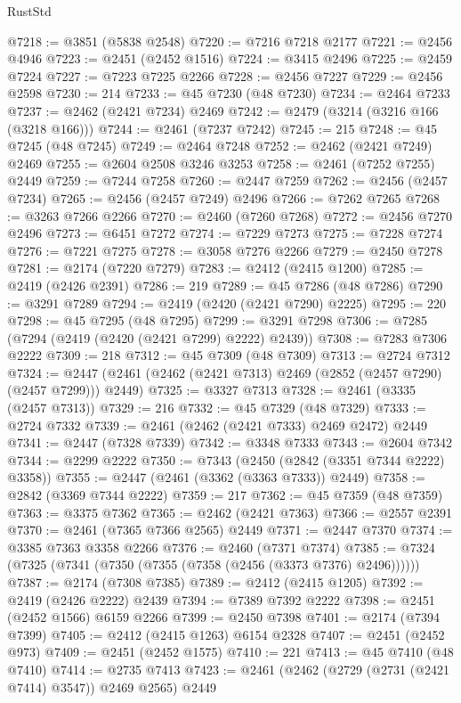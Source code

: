 \begin{lexlean}{RustStd}
\begin{coremodule}
@7218 := @3851 (@5838 @2548)
@7220 := @7216 @7218 @2177
@7221 := @2456 @4946
@7223 := @2451 (@2452 @1516)
@7224 := @3415 @2496
@7225 := @2459 @7224
@7227 := @7223 @7225 @2266
@7228 := @2456 @7227
@7229 := @2456 @2598
@7230 := 214
@7233 := @45 @7230 (@48 @7230)
@7234 := @2464 @7233
@7237 := @2462 (@2421 @7234) @2469
@7242 := @2479 (@3214 (@3216 @166 (@3218 @166)))
@7244 := @2461 (@7237 @7242)
@7245 := 215
@7248 := @45 @7245 (@48 @7245)
@7249 := @2464 @7248
@7252 := @2462 (@2421 @7249) @2469
@7255 := @2604 @2508 @3246 @3253
@7258 := @2461 (@7252 @7255) @2449
@7259 := @7244 @7258
@7260 := @2447 @7259
@7262 := @2456 (@2457 @7234)
@7265 := @2456 (@2457 @7249) @2496
@7266 := @7262 @7265
@7268 := @3263 @7266 @2266
@7270 := @2460 (@7260 @7268)
@7272 := @2456 @7270 @2496
@7273 := @6451 @7272
@7274 := @7229 @7273
@7275 := @7228 @7274
@7276 := @7221 @7275
@7278 := @3058 @7276 @2266
@7279 := @2450 @7278
@7281 := @2174 (@7220 @7279)
@7283 := @2412 (@2415 @1200)
@7285 := @2419 (@2426 @2391)
@7286 := 219
@7289 := @45 @7286 (@48 @7286)
@7290 := @3291 @7289
@7294 := @2419 (@2420 (@2421 @7290) @2225)
@7295 := 220
@7298 := @45 @7295 (@48 @7295)
@7299 := @3291 @7298
@7306 := @7285 (@7294 (@2419 (@2420 (@2421 @7299) @2222) @2439))
@7308 := @7283 @7306 @2222
@7309 := 218
@7312 := @45 @7309 (@48 @7309)
@7313 := @2724 @7312
@7324 := @2447 (@2461 (@2462 (@2421 @7313) @2469 (@2852 (@2457 @7290) (@2457 @7299))) @2449)
@7325 := @3327 @7313
@7328 := @2461 (@3335 (@2457 @7313))
@7329 := 216
@7332 := @45 @7329 (@48 @7329)
@7333 := @2724 @7332
@7339 := @2461 (@2462 (@2421 @7333) @2469 @2472) @2449
@7341 := @2447 (@7328 @7339)
@7342 := @3348 @7333
@7343 := @2604 @7342
@7344 := @2299 @2222
@7350 := @7343 (@2450 (@2842 (@3351 @7344 @2222) @3358))
@7355 := @2447 (@2461 (@3362 (@3363 @7333)) @2449)
@7358 := @2842 (@3369 @7344 @2222)
@7359 := 217
@7362 := @45 @7359 (@48 @7359)
@7363 := @3375 @7362
@7365 := @2462 (@2421 @7363)
@7366 := @2557 @2391
@7370 := @2461 (@7365 @7366 @2565) @2449
@7371 := @2447 @7370
@7374 := @3385 @7363 @3358 @2266
@7376 := @2460 (@7371 @7374)
@7385 := @7324 (@7325 (@7341 (@7350 (@7355 (@7358 (@2456 (@3373 @7376) @2496))))))
@7387 := @2174 (@7308 @7385)
@7389 := @2412 (@2415 @1205)
@7392 := @2419 (@2426 @2222) @2439
@7394 := @7389 @7392 @2222
@7398 := @2451 (@2452 @1566) @6159 @2266
@7399 := @2450 @7398
@7401 := @2174 (@7394 @7399)
@7405 := @2412 (@2415 @1263) @6154 @2328
@7407 := @2451 (@2452 @973)
@7409 := @2451 (@2452 @1575)
@7410 := 221
@7413 := @45 @7410 (@48 @7410)
@7414 := @2735 @7413
@7423 := @2461 (@2462 (@2729 (@2731 (@2421 @7414) @3547)) @2469 @2565) @2449

\end{coremodule}
\end{lexlean}
